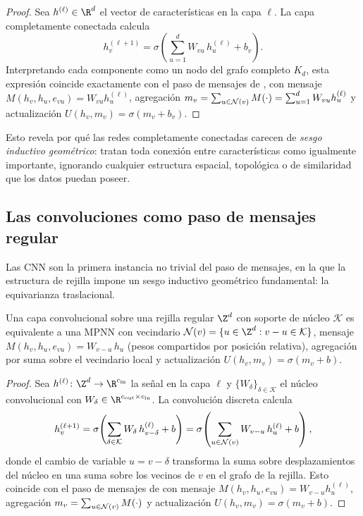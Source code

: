 \begin{proof}
Sea $h^{(\ell)} \in \R^d$ el vector de caracter\'isticas en la capa $\ell$. La
capa completamente conectada calcula
\[
  h_v^{(\ell+1)} = \sigma\!\left(\sum_{u=1}^{d} W_{vu}\, h_u^{(\ell)} + b_v\right).
\]
Interpretando cada componente como un nodo del grafo completo $K_d$, esta
expresi\'on coincide exactamente con el paso de mensajes de
, con mensaje
$M(h_v, h_u, e_{vu}) = W_{vu} h_u^{(\ell)}$, agregaci\'on
$m_v = \sum_{u \in \mathcal{N}(v)} M(\cdot) = \sum_{u=1}^d W_{vu} h_u^{(\ell)}$ y
actualizaci\'on $U(h_v, m_v) = \sigma(m_v + b_v)$. \qedhere
\end{proof}

Esto revela por qu\'e las redes completamente conectadas carecen de \emph{sesgo
inductivo geom\'etrico}: tratan toda conexi\'on entre caracter\'isticas como
igualmente importante, ignorando cualquier estructura espacial, topol\'ogica o de
similaridad que los datos puedan poseer.

\subsection{Las convoluciones como paso de mensajes regular}
\label{subsec:priors:cnn-mpnn}

Las CNN son la primera instancia no trivial del paso de mensajes, en la que la
estructura de rejilla impone un sesgo inductivo geom\'etrico fundamental: la
equivarianza traslacional.

\begin{proposition}
\label{prop:priors:cnn-mpnn}
Una capa convolucional sobre una rejilla regular $\Z^d$ con soporte de n\'ucleo
$\mathcal{K}$ es equivalente a una MPNN con vecindario
$\Nb(v) = \{u \in \Z^d : v - u \in \mathcal{K}\}$, mensaje
$M(h_v, h_u, e_{vu}) = W_{v-u}\, h_u$ (pesos compartidos por posici\'on
relativa), agregaci\'on por suma sobre el vecindario local y actualizaci\'on
$U(h_v, m_v) = \sigma(m_v + b)$.
\end{proposition}

\begin{proof}
Sea $h^{(\ell)} \colon \Z^d \to \R^{c_{\mathrm{in}}}$ la se\~nal en la capa
$\ell$ y $\{W_\delta\}_{\delta \in \mathcal{K}}$ el n\'ucleo convolucional con
$W_\delta \in \R^{c_{\mathrm{out}} \times c_{\mathrm{in}}}$. La convoluci\'on
discreta calcula
\[
  h_v^{(\ell+1)}
    = \sigma\!\left(\sum_{\delta \in \mathcal{K}} W_\delta\, h_{v-\delta}^{(\ell)} + b\right)
    = \sigma\!\left(\sum_{u \in \mathcal{N}(v)} W_{v-u}\, h_u^{(\ell)} + b\right),
\]
donde el cambio de variable $u = v - \delta$ transforma la suma sobre
desplazamientos del n\'ucleo en una suma sobre los vecinos de $v$ en el grafo de
la rejilla. Esto coincide con el paso de mensajes de  con
mensaje $M(h_v, h_u, e_{vu}) = W_{v-u} h_u^{(\ell)}$, agregaci\'on
$m_v = \sum_{u \in \mathcal{N}(v)} M(\cdot)$ y actualizaci\'on
$U(h_v, m_v) = \sigma(m_v + b)$. \qedhere
\end{proof}

